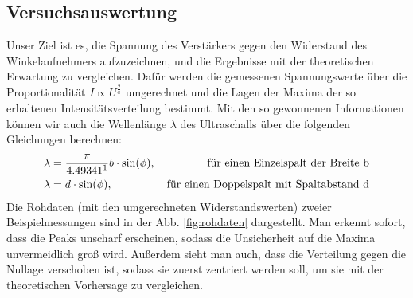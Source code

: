 \documentclass[12pt,a4paper]{article}
\begin{document}
\subsection{Versuchsauswertung}
Unser Ziel ist es, die Spannung des Verstärkers gegen den Widerstand des Winkelaufnehmers aufzuzeichnen, und die Ergebnisse mit der theoretischen Erwartung zu vergleichen. Dafür werden die gemessenen Spannungswerte über die Proportionalität $I\propto U^{\frac{2}{a}}$ umgerechnet und die Lagen der Maxima der so erhaltenen Intensitätsverteilung bestimmt. Mit den so gewonnenen Informationen können wir auch die Wellenlänge $\lambda$ des Ultraschalls über die folgenden Gleichungen berechnen:
\begin{align*}
	\lambda &= \frac{\pi}{4.49341\footnotemark}b \cdot \sin(\phi),&\, \text{für einen Einzelspalt der Breite b}\\
	\lambda &= d \cdot \sin(\phi),&\, \text{für einen Doppelspalt mit Spaltabstand d}
\end{align*}
Die Rohdaten (mit den umgerechneten Widerstandswerten) zweier Beispielmessungen sind in der Abb. \ref{fig:rohdaten} dargestellt. Man erkennt sofort, dass die Peaks unscharf erscheinen, sodass die Unsicherheit auf die Maxima unvermeidlich groß wird. Außerdem sieht man auch, dass die Verteilung gegen die Nullage verschoben ist, sodass sie zuerst zentriert werden soll, um sie mit der theoretischen Vorhersage zu vergleichen.
\end{document}

